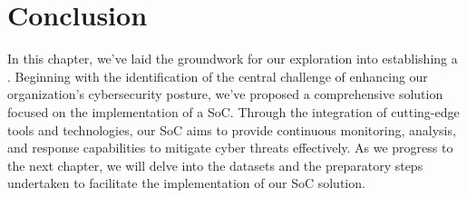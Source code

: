 
\setcounter{secnumdepth}{0} %
\section{Conclusion}
In this chapter, we've laid the groundwork for our exploration into establishing a . Beginning with the identification of the central challenge of enhancing our organization's cybersecurity posture, we've proposed a comprehensive solution focused on the implementation of a SoC. Through the integration of cutting-edge tools and technologies, our SoC aims to provide continuous monitoring, analysis, and response capabilities to mitigate cyber threats effectively. As we progress to the next chapter, we will delve into the datasets and the preparatory steps undertaken to facilitate the implementation of our SoC solution.

